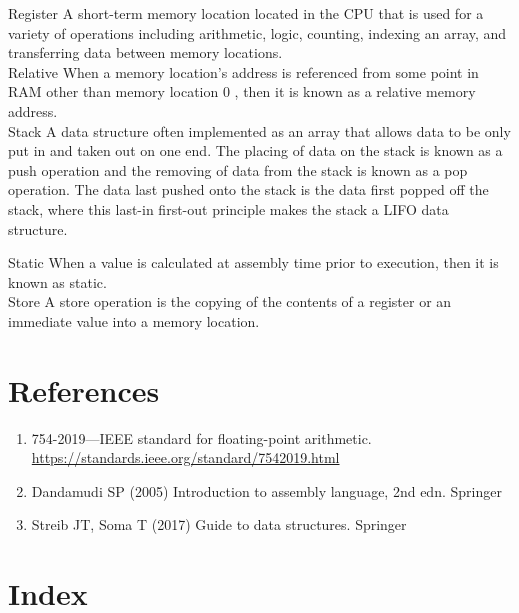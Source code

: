 \documentclass[10pt]{book}
\begin{document}
\begin{center}
\begin{center}
\begin{center}
\begin{center}
\begin{center}
Register A short-term memory location located in the CPU that is used for a variety of operations including arithmetic, logic, counting, indexing an array, and transferring data between memory locations.\\
Relative When a memory location's address is referenced from some point in RAM other than memory location 0 , then it is known as a relative memory address.\\
Stack A data structure often implemented as an array that allows data to be only put in and taken out on one end. The placing of data on the stack is known as a push operation and the removing of data from the stack is known as a pop operation. The data last pushed onto the stack is the data first popped off the stack, where this last-in first-out principle makes the stack a LIFO data structure.

Static When a value is calculated at assembly time prior to execution, then it is known as static.\\

Store A store operation is the copying of the contents of a register or an immediate value into a memory location.


\section*{References}
\begin{enumerate}
  \item 754-2019—IEEE standard for floating-point arithmetic. \href{https://standards.ieee.org/standard/7542019.html}{https://standards.ieee.org/standard/7542019.html}
  \item Dandamudi SP (2005) Introduction to assembly language, 2nd edn. Springer
  \item Streib JT, Soma T (2017) Guide to data structures. Springer
\end{enumerate}

\section*{Index}

\end{center}
\end{center}
\end{center}
\end{center}
\end{center}
\end{document}
